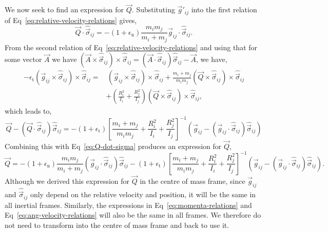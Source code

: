 \documentclass{article}
\begin{document}
We now seek to find an expression for $\vec{Q}$. Substituting $\vec{g}'_{ij}$ into the first relation of Eq~\ref{eq:relative-velocity-relations} gives,
\begin{equation}
\label{eq:Q-dot-sigma}
    \vec{Q} \cdot \hat{\vec{\sigma}}_{ij}
    =
    -(1 + \epsilon_\mathrm{n})
    \frac{m_i m_j}{m_i + m_j}
    \vec{g}_{ij} \cdot \hat{\vec{\sigma}}_{ij}.
\end{equation}
From the second relation of Eq~\ref{eq:relative-velocity-relations} and using that for some vector $\vec{A}$ we have $(\vec{A} \times \hat{\vec{\sigma}}_{ij}) \times \hat{\vec{\sigma}}_{ij} = (\vec{A} \cdot \hat{\vec{\sigma}}_{ij}) \hat{\vec{\sigma}}_{ij} - \vec{A}$, we have,
\begin{align}
    - \epsilon_\mathrm{t} (\vec{g}_{ij} \times \hat{\vec{\sigma}}_{ij}) \times \hat{\vec{\sigma}}_{ij}
    =& \,
    (\vec{g}_{ij} \times \hat{\vec{\sigma}}_{ij}) \times \hat{\vec{\sigma}}_{ij}
    +
    \frac{m_i + m_j}{m_i m_j}
    (\vec{Q} \times \hat{\vec{\sigma}}_{ij}) \times \hat{\vec{\sigma}}_{ij} \\
     &+ 
    \left(
        \frac{R_i^2}{I_i} + \frac{R_j^2}{I_j}
    \right)
    (\vec{Q} \times \hat{\vec{\sigma}}_{ij}) \times \hat{\vec{\sigma}}_{ij},
\end{align}
which leads to,
\begin{equation}
    \vec{Q} - (\vec{Q} \cdot \hat{\vec{\sigma}}_{ij}) \hat{\vec{\sigma}}_{ij}
    =
    -(1+\epsilon_\mathrm{t})
    \left[
        \frac{m_i + m_j}{m_i m_j}
        +
        \frac{R_i^2}{I_i} + \frac{R_j^2}{I_j}
    \right]^{-1}
    \left(
        \vec{g}_{ij} - (\vec{g}_{ij} \cdot \hat{\vec{\sigma}}_{ij}) \hat{\vec{\sigma}}_{ij}
    \right)
\end{equation}
Combining this with Eq~\ref{eq:Q-dot-sigma} produces an expression for $\vec{Q}$,
\begin{equation}
\label{eq:disc-disc-Q}
    \vec{Q}
    =
    -(1 + \epsilon_\mathrm{n})
    \frac{m_i m_j}{m_i + m_j}
    (\vec{g}_{ij} \cdot \hat{\vec{\sigma}}_{ij}) \hat{\vec{\sigma}}_{ij}
    -
    (1+\epsilon_\mathrm{t})
    \left[
        \frac{m_i + m_j}{m_i m_j}
        +
        \frac{R_i^2}{I_i} + \frac{R_j^2}{I_j}
    \right]^{-1}
    \left(
        \vec{g}_{ij} - (\vec{g}_{ij} \cdot \hat{\vec{\sigma}}_{ij}) \hat{\vec{\sigma}}_{ij}
    \right).
\end{equation}
Although we derived this expression for $\vec{Q}$ in the centre of mass frame, since $\vec{g}_{ij}$ and $\hat{\vec{\sigma}}_{ij}$ only depend on the relative velocity and position, it will be the same in all inertial frames. Similarly, the expressions in Eq~\ref{eq:momenta-relations} and Eq~\ref{eq:ang-velocity-relations} will also be the same in all frames. We therefore do not need to transform into the centre of mass frame and back to use it.
\end{document}
